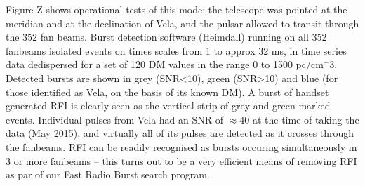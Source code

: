 Figure Z shows operational tests of this mode; the telescope was pointed at the meridian and at the declination of Vela, and the pulsar allowed to transit through the 352 fan beams. Burst detection software (Heimdall) running on all 352 fanbeams isolated events on times scales from 1 to approx 32 ms, in time series data dedispersed for a set of 120 DM values in the range 0 to 1500 pc/cm$^-3$. Detected bursts are shown in grey (SNR<10), green (SNR>10) and blue (for those identified as Vela, on the basis of its known DM). A burst of handset generated RFI is clearly seen as the vertical strip of grey and green marked events. Individual pulses from Vela had an SNR of $\approx 40$ at the time of taking the data (May 2015), and virtually all of its pulses are detected as it crosses through the fanbeams. RFI can be readily recognised as bursts occuring simultaneously in 3 or more fanbeams -- this turns out to be a very efficient means of removing RFI as par of our Fast Radio Burst search program.    
